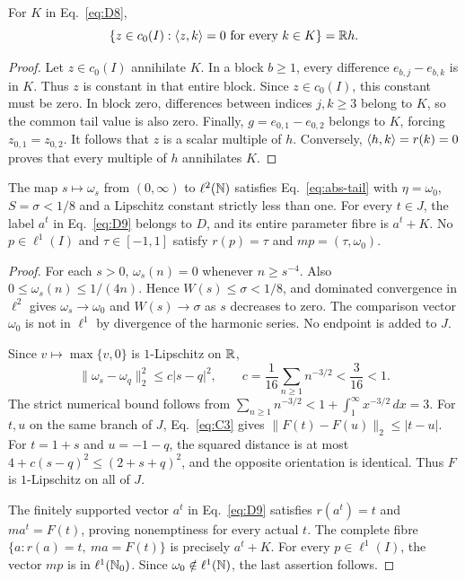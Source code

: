 \begin{lemma}
\label{lem:coordinate-annihilator}
For $K$ in Eq.~\eqref{eq:D8},
\[
\{z\in c_0(I):\langle z,k\rangle=0\ \text{for every }k\in K\}=\mathbb R h.
\]
\end{lemma}
\begin{proof}
Let $z\in c_0(I)$ annihilate $K$. In a block $b\ge1$, every
difference $e_{b,j}-e_{b,k}$ is in $K$. Thus $z$ is constant in that
entire block. Since $z\in c_0(I)$, this constant must be zero. In block
zero, differences between indices $j,k\ge3$ belong to $K$, so the common
tail value is also zero. Finally, $g=e_{0,1}-e_{0,2}$ belongs to $K$,
forcing $z_{0,1}=z_{0,2}$. It follows that $z$ is a scalar multiple of
$h$. Conversely, $\langle h,k\rangle=r(k)=0$ proves that every multiple of $h$
annihilates $K$.
\end{proof}

\begin{lemma}
\label{lem:coordinate-profile}
The map $s\mapsto\omega_s$ from $(0,\infty)$ to $\ell^2(\mathbb N)$
satisfies Eq.~\eqref{eq:abs-tail} with $\eta=\omega_0$, $S=\sigma<1/8$
and a Lipschitz constant strictly less than one. For every $t\in J$,
the label $a^t$ in Eq.~\eqref{eq:D9} belongs to $D$, and its entire
parameter fibre is $a^t+K$. No $p\in\ell^1(I)$ and $\tau\in[-1,1]$
satisfy $r(p)=\tau$ and $mp=(\tau,\omega_0)$.
\end{lemma}
\begin{proof}
\label{sec:C2}
For each $s>0$, $\omega_s(n)=0$ whenever $n\ge s^{-4}$. Also
$0\le\omega_s(n)\le1/(4n)$. Hence $W(s)\le\sigma<1/8$, and dominated
convergence in $\ell^2$ gives $\omega_s\to\omega_0$ and $W(s)\to\sigma$
as $s$ decreases to zero. The comparison vector $\omega_0$ is not in
$\ell^1$ by divergence of the harmonic series. No endpoint is added to $J$.

Since $v\mapsto\max\{v,0\}$ is $1$-Lipschitz on $\mathbb R$,
\begin{equation}
\|\omega_s-\omega_q\|_2^2\le c|s-q|^2,\qquad
c=\frac1{16}\sum_{n\ge1}n^{-3/2}<\frac3{16}<1.
\label{eq:C3}
\end{equation}
The strict numerical bound follows from
$\sum_{n\ge1}n^{-3/2}<1+\int_1^\infty x^{-3/2}\,dx=3$.
For $t,u$ on the same branch of $J$, Eq.~\eqref{eq:C3} gives
$\|F(t)-F(u)\|_2\le|t-u|$. For $t=1+s$ and $u=-1-q$, the squared
distance is at most $4+c(s-q)^2\le(2+s+q)^2$, and the opposite
orientation is identical. Thus $F$ is $1$-Lipschitz on all of $J$.

The finitely supported vector $a^t$ in Eq.~\eqref{eq:D9} satisfies $r(a^t)=t$ and
$ma^t=F(t)$, proving nonemptiness for every actual $t$. The complete
fibre $\{a:r(a)=t,\ ma=F(t)\}$ is precisely $a^t+K$.
For every $p\in\ell^1(I)$, the vector $mp$ is in $\ell^1(\mathbb N_0)$.
Since $\omega_0\notin\ell^1(\mathbb N)$, the last assertion follows.
\end{proof}


